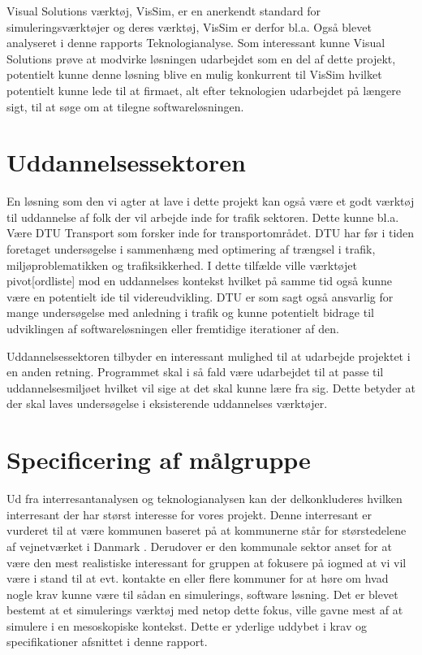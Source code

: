\vspace{5mm}

Visual Solutions værktøj, VisSim, er en anerkendt standard for simuleringsværktøjer og deres værktøj, VisSim er derfor bl.a. Også blevet analyseret i denne rapports Teknologianalyse. Som interessant kunne Visual Solutions prøve at modvirke løsningen udarbejdet som en del af dette projekt, potentielt kunne denne løsning blive en mulig konkurrent til VisSim hvilket potentielt kunne lede til at firmaet, alt efter teknologien udarbejdet på længere sigt, til at søge om at tilegne softwareløsningen.

\section{Uddannelsessektoren}
En løsning som den vi agter at lave i dette projekt kan også være et godt værktøj til uddannelse af folk der vil arbejde inde for trafik sektoren. Dette kunne bl.a. Være DTU Transport som forsker inde for transportområdet. DTU har før i tiden foretaget undersøgelse i sammenhæng med optimering af trængsel i trafik, miljøproblematikken og trafiksikkerhed\cite{DtuForskning}. I dette tilfælde ville værktøjet pivot[ordliste] mod en uddannelses kontekst hvilket på samme tid også kunne være en potentielt ide til videreudvikling. DTU er som sagt også ansvarlig for mange undersøgelse med anledning i trafik og kunne potentielt bidrage til udviklingen af softwareløsningen eller fremtidige iterationer af den.

\vspace{5mm}

Uddannelsessektoren tilbyder en interessant mulighed til at udarbejde projektet i en anden retning. Programmet skal i så fald være udarbejdet til at passe til uddannelsesmiljøet hvilket vil sige at det skal kunne lære fra sig. Dette betyder at der skal laves undersøgelse i eksisterende uddannelses værktøjer.

\section{Specificering af målgruppe}

Ud fra interresantanalysen og teknologianalysen kan der delkonkluderes hvilken interresant der har størst interesse for vores projekt. Denne interresant er vurderet til at være kommunen baseret på at kommunerne står for størstedelene af vejnetværket i Danmark \cite{benjasfar}. Derudover er den kommunale sektor anset for at være den mest realistiske interessant for gruppen at fokusere på iogmed at vi vil være i stand til at evt. kontakte en eller flere kommuner for at høre om hvad nogle krav kunne være til sådan en simulerings, software løsning. Det er blevet bestemt at et simulerings værktøj med netop dette fokus, ville gavne mest af at simulere i en mesoskopiske kontekst. Dette er yderlige uddybet i krav og specifikationer afsnittet i denne rapport.
